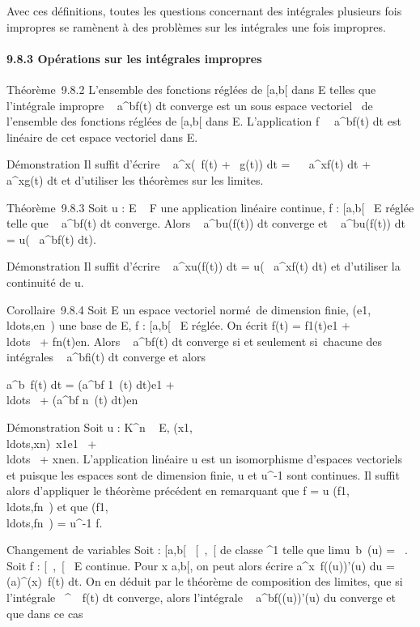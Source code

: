 Avec ces définitions, toutes les questions concernant des intégrales
plusieurs fois impropres se ramènent à des problèmes sur les intégrales
une fois impropres.

\paragraph{9.8.3 Opérations sur les intégrales impropres}

Théorème~9.8.2 L'ensemble des fonctions réglées de {[}a,b{[} dans E
telles que l'intégrale impropre \int ~
a^bf(t) dt converge est un sous espace vectoriel ~de
l'ensemble des fonctions réglées de {[}a,b{[} dans E. L'application
f\mapsto~\int ~
a^bf(t) dt est linéaire de cet espace vectoriel dans E.

Démonstration Il suffit d'écrire \int ~
a^x(\alpha~f(t) + \beta~g(t)) dt = \alpha~\int ~
a^xf(t) dt + \beta~\int ~
a^xg(t) dt et d'utiliser les théorèmes sur les limites.

Théorème~9.8.3 Soit u : E \rightarrow~ F une application linéaire continue, f :
{[}a,b{[}\rightarrow~ E réglée telle que \int ~
a^bf(t) dt converge. Alors \int ~
a^bu(f(t)) dt converge et \int ~
a^bu(f(t)) dt = u(\int ~
a^bf(t) dt).

Démonstration Il suffit d'écrire \int ~
a^xu(f(t)) dt = u(\int ~
a^xf(t) dt) et d'utiliser la continuité de u.

Corollaire~9.8.4 Soit E un espace vectoriel normé~de dimension finie,
(e1,\\ldots,en~)
une base de E, f : {[}a,b{[}\rightarrow~ E réglée. On écrit f(t) =
f1(t)e1 +
\\ldots~ +
fn(t)en. Alors \int ~
a^bf(t) dt converge si et seulement si~chacune des
intégrales \int ~
a^bfi(t) dt converge et alors

\int  a^b~f(t) dt =
(\int  a^bf 1~(t)
dt)e1 +
\\ldots~ +
(\int  a^bf n~(t)
dt)en

Démonstration Soit u : K^n \rightarrow~ E,
(x1,\\ldots,xn)\mapsto~x1e1~
+ \\ldots~ +
xnen. L'application linéaire u est un isomorphisme
d'espaces vectoriels et puisque les espaces sont de dimension finie, u
et u^-1 sont continues. Il suffit alors d'appliquer le
théorème précédent en remarquant que f = u \cdot
(f1,\\ldots,fn~)
et que
(f1,\\ldots,fn~)
= u^-1 \cdot f.

Changement de variables Soit \phi : {[}a,b{[}\rightarrow~ {[}\alpha~,\beta~{[} de classe
^1 telle que limu\rightarrow~b~\phi(u)
= \beta~. Soit f : {[}\alpha~,\beta~{[}\rightarrow~ E continue. Pour x \in {[}a,b{[}, on peut alors
écrire \int  a^x~f(\phi(u))\phi'(u) du
=\int  \phi(a)^\phi(x)~f(t) dt. On en
déduit par le théorème de composition des limites, que si l'intégrale
\int  \alpha~^\beta~~f(t) dt converge, alors
l'intégrale \int ~
a^bf(\phi(u))\phi'(u) du converge et que dans ce cas

